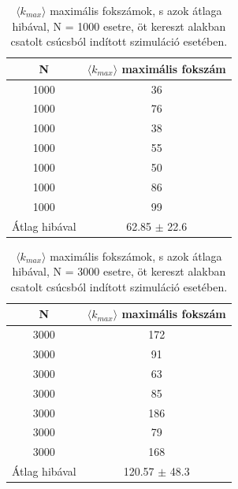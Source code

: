 \documentclass[a4paper, 12pt]{article}
\numberwithin{equation}{section}          %
\numberwithin{figure}{subsection}
\begin{document}
\begin{table}[ht!]
	\captionsetup{justification=centering}
	\begin{center}
		\begin{tabular}{||c|c||}
			\hline
			N & $\langle k_{max} \rangle$ maximális fokszám \\  \hline
			1000 & 36 \\	\hline
			1000 &76 \\	\hline
			1000 &38\\	\hline
			1000 & 55\\	\hline
			1000 & 50\\	\hline
			1000 & 86\\	\hline
			1000 & 99 \\	\hline
			Átlag hibával & 62.85 $\pm$ 22.6\\  \hline
		\end{tabular}
		\caption{$\langle k_{max} \rangle$ maximális fokszámok, s azok átlaga hibával, N = 1000 esetre, öt kereszt alakban
			csatolt csúcsból indított szimuláció esetében.}
	\end{center}
\end{table}




\begin{table}[ht!]
	\captionsetup{justification=centering}
	\begin{center}
		\begin{tabular}{||c|c||}
			\hline
			N & $\langle k_{max} \rangle$ maximális fokszám \\  \hline
			3000 & 172 \\	\hline
			3000 &91 \\	\hline
			3000 & 63\\	\hline
			3000 & 85\\	\hline
			3000 & 186\\	\hline
			3000 & 79\\	\hline
			3000 & 168 \\	\hline
			Átlag hibával & 120.57 $\pm$ 48.3\\  \hline
		\end{tabular}
		\caption{$\langle k_{max} \rangle$ maximális fokszámok, s azok átlaga hibával, N = 3000 esetre, öt kereszt alakban
			csatolt csúcsból indított szimuláció esetében.}
	\end{center}
\end{table}
\end{document}
